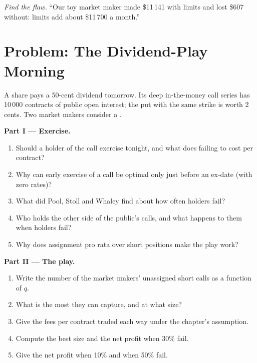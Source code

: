 \begin{exercise}[$\star\star\star$]\label{exo:dv:options-market-making-in-practice:8}
\emph{Find the flaw.} ``Our toy market maker made \$11\,141 with limits and lost \$607 without: limits add about \$11\,700 a month.''
\end{exercise}

\section{Problem: The Dividend-Play Morning}

\begin{problem}\label{pb:dv:options-market-making-in-practice:1}
A share pays a 50-cent dividend tomorrow. Its deep in-the-money call series has 10\,000 contracts of public open interest; the put with the same strike is worth 2
cents. Two market makers consider a .

\medskip\noindent\textbf{Part I --- Exercise.}
\begin{enumerate}
\item Should a holder of the call exercise tonight, and what does failing to cost per contract?
\item Why can early exercise of a call be optimal only just before an ex-date (with zero rates)?
\item What did Pool, Stoll and Whaley find about how often holders fail?
\item Who holds the other side of the public's calls, and what happens to them when holders fail?
\item Why does assignment pro rata over short positions make the play work?
\end{enumerate}

\medskip\noindent\textbf{Part II --- The play.}
\begin{enumerate}[resume]
\item Write the number of the market makers' unassigned short calls as a function of $q$.
\item What is the most they can capture, and at what size?
\item Give the fees per contract traded each way under the chapter's assumption.
\item Compute the best size and the net profit when 30\% fail.
\item Give the net profit when 10\% and when 50\% fail.
\end{enumerate}


\end{problem}
